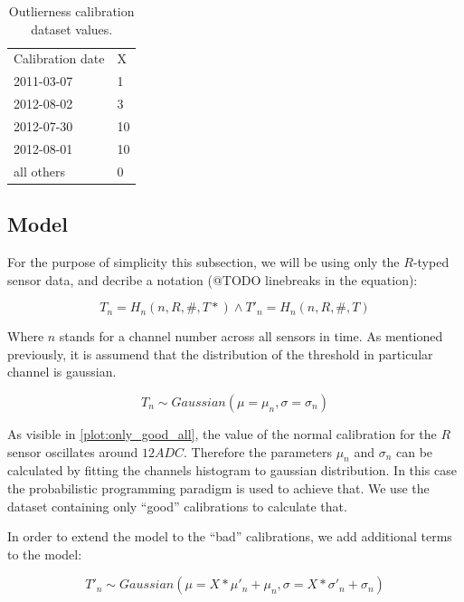 \begin{table}[h]
\caption{\label{data-table}Outlierness calibration dataset values.}
\begin{center}
\begin{tabular}{ll}
Calibration date& X\\
2011-03-07&1\\
2012-08-02&3\\
2012-07-30&10\\
2012-08-01&10\\
all others&0\\
\end{tabular}
\end{center}
\end{table}

\subsection{Model}

For the purpose of simplicity this subsection, we will be using only the $R$-typed sensor data, and decribe a notation (@TODO linebreaks in the equation):


\begin{equation}
  \label{notation}
   T_n = H_{n}(n, R, \#, T*) \land T\prime_n = H_{n}(n, R, \#, T)
  \end{equation}

Where $n$ stands for a channel number across all sensors in time.
As mentioned previously, it is assumend that the distribution of the threshold in particular channel is gaussian.

\begin{equation}
  \label{basoc-model}
    T_n \sim Gaussian(\mu=\mu_n, \sigma=\sigma_n)
  \end{equation}

As visible in \ref{plot:only_good_all}, the value of the normal calibration for the $R $ sensor oscillates around $12 ADC$.
Therefore the parameters $\mu_{n}$ and $\sigma_{n}$ can be calculated by fitting the channels histogram to gaussian distribution.
In this case the probabilistic programming paradigm is used to achieve that. We use the dataset containing only ``good'' calibrations to calculate that.

In order to extend the model to the ``bad'' calibrations, we add additional terms to the model:

\begin{equation}
    \label{total-model}
    T\prime_n \sim Gaussian(\mu=X*\mu\prime_n+\mu_n, \sigma=X*\sigma\prime_n+\sigma_n)
\end{equation}

